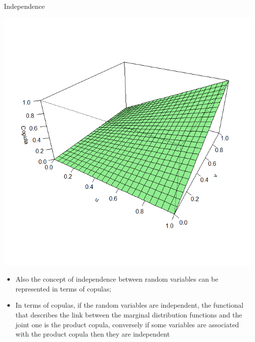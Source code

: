 \documentclass[11pt]{beamer}
\theoremstyle{plain}
\theoremstyle{definition}
\theoremstyle{remark}
\begin{document}
%
\begin{frame}{Independence}
	\noindent
	\begin{minipage}{0.5\textwidth}%
	\includegraphics[width=\linewidth]{fig/copula_prodotto.png}
	\end{minipage}%
	\hfill%
	\begin{minipage}{0.5\textwidth}
	\begin{itemize}
		\item Also the concept of independence between random variables can be represented in terms of copulas;
		\item In terms of copulas, if the random variables are independent, the functional that describes the link between the marginal 
		distribution functions and the joint one is the product copula, conversely if some variables are associated with the product copula then
		they are independent
	\end{itemize}
	\end{minipage}
\end{frame}
\end{document}
